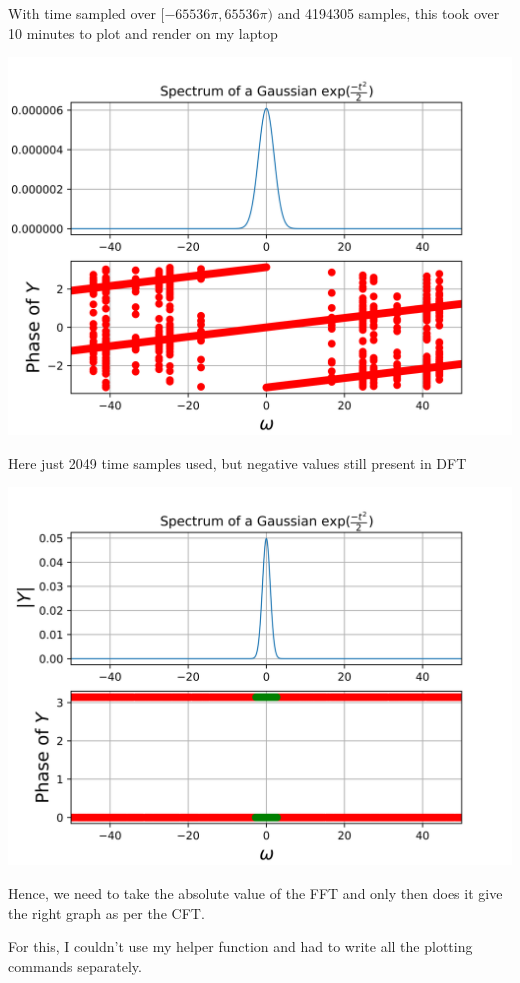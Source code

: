 \documentclass[12pt]{article}
\begin{document}
\begin{center}
    {With time sampled over $[-65536\pi,65536\pi)$ and 4194305 samples, this took over 10 minutes to plot and render on my laptop}
    
    \includegraphics[scale=0.7]{images/fig9_forthelol.png}
    
    
    {Here just 2049 time samples used, but negative values still present in DFT}
    
    \includegraphics[scale=0.7]{images/fig10.png}
\end{center}
\pagebreak
Hence, we need to take the absolute value of the FFT and only then does it give the right graph as per the CFT.

For this, I couldn't use my helper function and had to write all the plotting commands separately.
\end{document}
